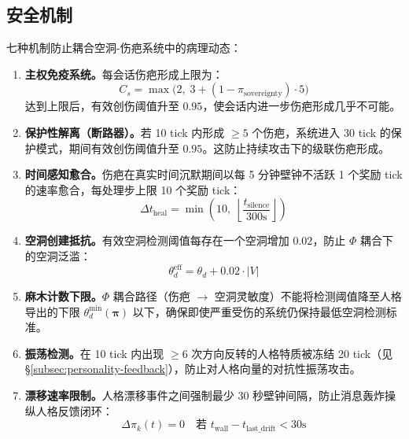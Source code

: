 \documentclass[11pt]{article}
\begin{document}
\subsection{安全机制}
\label{subsec:safety}

七种机制防止耦合空洞-伤疤系统中的病理动态：

\begin{enumerate}[leftmargin=*]
\item \textbf{主权免疫系统。}每会话伤疤形成上限为：
\begin{equation}
C_s = \max\bigl(2,\; 3 + (1 - \pi_{\text{sovereignty}}) \cdot 5\bigr)
\end{equation}
达到上限后，有效创伤阈值升至 $0.95$，使会话内进一步伤疤形成几乎不可能。

\item \textbf{保护性解离（断路器）。}若 10 tick 内形成 $\geq 5$ 个伤疤，系统进入 30 tick 的保护模式，期间有效创伤阈值升至 $0.95$。这防止持续攻击下的级联伤疤形成。

\item \textbf{时间感知愈合。}伤疤在真实时间沉默期间以每 5 分钟壁钟不活跃 1 个奖励 tick 的速率愈合，每处理步上限 10 个奖励 tick：
\begin{equation}
\Delta t_{\text{heal}} = \min\!\left(10,\; \left\lfloor \frac{t_{\text{silence}}}{300\text{s}} \right\rfloor\right)
\end{equation}

\item \textbf{空洞创建抵抗。}有效空洞检测阈值每存在一个空洞增加 $0.02$，防止 $\Phi$ 耦合下的空洞泛滥：
\begin{equation}
\theta_d^{\text{eff}} = \theta_d + 0.02 \cdot |V|
\end{equation}

\item \textbf{麻木计数下限。}$\Phi$ 耦合路径（伤疤 $\to$ 空洞灵敏度）不能将检测阈值降至人格导出的下限 $\theta_d^{\min}(\boldsymbol{\pi})$ 以下，确保即使严重受伤的系统仍保持最低空洞检测标准。

\item \textbf{振荡检测。}在 10 tick 内出现 $\geq 6$ 次方向反转的人格特质被冻结 20 tick（见 \S\ref{subsec:personality-feedback}），防止对人格向量的对抗性振荡攻击。

\item \textbf{漂移速率限制。}人格漂移事件之间强制最少 30 秒壁钟间隔，防止消息轰炸操纵人格反馈闭环：
\begin{equation}
\Delta\pi_k(t) = 0 \quad \text{若 } t_{\text{wall}} - t_{\text{last\_drift}} < 30\text{s}
\end{equation}
\end{enumerate}
\end{document}
